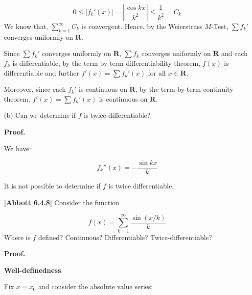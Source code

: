 \documentclass[10pt]{article}
\begin{document}
\begin{equation*}
0\leq |f_{k} '( x) |=\left| \frac{\cos kx}{k^{2}}\right| \leq \frac{1}{k^{2}} =C_{k}
\end{equation*}
We know that, $\displaystyle \sum _{k=1}^{\infty } C_{k}$ is convergent. Hence, by the Weierstrass $\displaystyle M$-Test, $\displaystyle \sum f_{k} '$ converges uniformly on $\displaystyle \mathbf{R}$. 



Since $\displaystyle \sum f_{k} '$ converges uniformly on $\displaystyle \mathbf{R}$, $\displaystyle \sum f_{k}$ converges uniformly on $\displaystyle \mathbf{R}$ and each $\displaystyle f_{k}$ is differentiable, by the term by term differentiability theorem, $\displaystyle f( x)$ is differentiable and further $\displaystyle f'( x) =\sum f_{k} '( x)$ for all $\displaystyle x\in \mathbf{R}$. 



Moreover, since each $\displaystyle f_{k} '$ is continuous on $\displaystyle \mathbf{R}$, by the term-by-term continuity theorem, $\displaystyle f'( x) =\sum f_{k} '( x)$ is continuous on $\displaystyle \mathbf{R}$.



(b) Can we determine if $\displaystyle f$ is twice-differentiable?



\textbf{Proof.}



We have:


\begin{equation*}
f_{k} ''( x) =-\frac{\sin kx}{k}
\end{equation*}


It is not possible to determine if $\displaystyle f$ is twice differentiable.



\textbf{[Abbott 6.4.8]} Consider the function 


\begin{equation*}
f( x) =\sum _{k=1}^{\infty }\frac{\sin( x/k)}{k}
\end{equation*}
Where is $\displaystyle f$ defined? Continuous? Differentiable? Twice-differentiable?



\textbf{Proof.}



\textbf{Well-definedness}.

Fix $\displaystyle x=x_{0}$ and consider the absolute value series:
\end{document}

